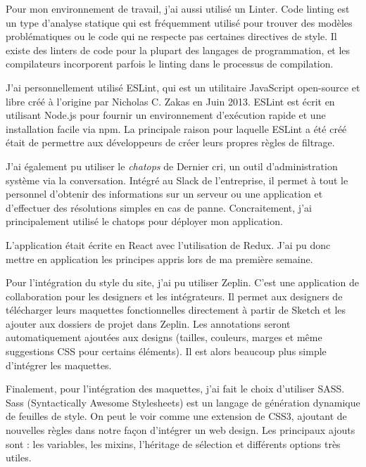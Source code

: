\bigskip

Pour mon environnement de travail, j'ai aussi utilisé un Linter. Code
linting est un type d'analyse statique qui est fréquemment utilisé pour
trouver des modèles problématiques ou le code qui ne respecte pas
certaines directives de style. Il existe des linters de code pour la
plupart des langages de programmation, et les compilateurs incorporent
parfois le linting dans le processus de compilation.

\bigskip

J'ai personnellement utilisé ESLint, qui est un utilitaire JavaScript
open-source et libre créé à l'origine par Nicholas C. Zakas en Juin
2013. ESLint est écrit en utilisant Node.js pour fournir un
environnement d'exécution rapide et une installation facile via npm. La
principale raison pour laquelle ESLint a été créé était de permettre aux
développeurs de créer leurs propres règles de filtrage.

\bigskip

J'ai également pu utiliser le \emph{chatops} de Dernier cri, un outil
d'administration système via la conversation. Intégré au Slack de
l'entreprise, il permet à tout le personnel d'obtenir des informations
sur un serveur ou une application et d'effectuer des résolutions simples
en cas de panne. Concraitement, j'ai principalement utilisé le chatops
pour déployer mon application.

\bigskip

L'application était écrite en React avec l'utilisation de Redux. J'ai pu
donc mettre en application les principes appris lors de ma première
semaine.

\bigskip

Pour l'intégration du style du site, j'ai pu utiliser Zeplin. C'est une
application de collaboration pour les designers et les intégrateurs. Il
permet aux designers de télécharger leurs maquettes fonctionnelles
directement à partir de Sketch et les ajouter aux dossiers de projet
dans Zeplin. Les annotations seront automatiquement ajoutées aux designs
(tailles, couleurs, marges et même suggestions CSS pour certains
éléments). Il est alors beaucoup plus simple d'intégrer les maquettes.

\bigskip

Finalement, pour l'intégration des maquettes, j'ai fait le choix
d'utiliser SASS. Sass (Syntactically Awesome Stylesheets) est un langage
de génération dynamique de feuilles de style. On peut le voir comme une
extension de CSS3, ajoutant de nouvelles règles dans notre façon
d'intégrer un web design. Les principaux ajouts sont : les variables,
les mixins, l'héritage de sélection et différents options très utiles.

